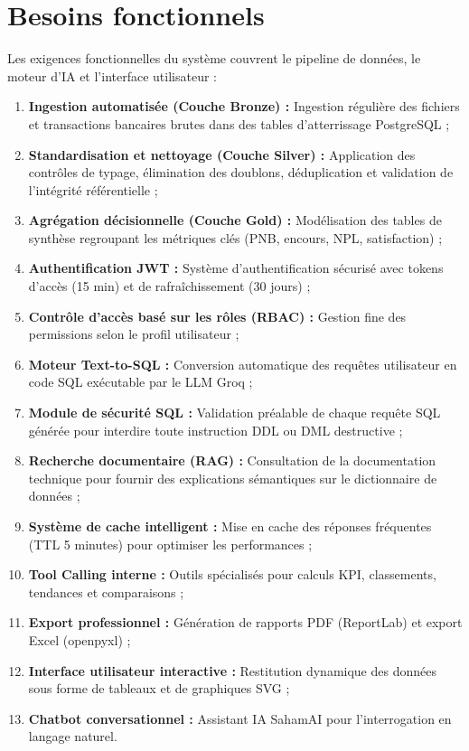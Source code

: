 \documentclass[a4paper,12pt]{report}
\begin{document}
\section{Besoins fonctionnels}
\begin{doublespace}
Les exigences fonctionnelles du système couvrent le pipeline de données, le moteur d'IA et l'interface utilisateur :
\begin{enumerate}
    \item \textbf{Ingestion automatisée (Couche Bronze) :} Ingestion régulière des fichiers et transactions bancaires brutes dans des tables d'atterrissage PostgreSQL ;
    \item \textbf{Standardisation et nettoyage (Couche Silver) :} Application des contrôles de typage, élimination des doublons, déduplication et validation de l'intégrité référentielle ;
    \item \textbf{Agrégation décisionnelle (Couche Gold) :} Modélisation des tables de synthèse regroupant les métriques clés (PNB, encours, NPL, satisfaction) ;
    \item \textbf{Authentification JWT :} Système d'authentification sécurisé avec tokens d'accès (15 min) et de rafraîchissement (30 jours) ;
    \item \textbf{Contrôle d'accès basé sur les rôles (RBAC) :} Gestion fine des permissions selon le profil utilisateur ;
    \item \textbf{Moteur Text-to-SQL :} Conversion automatique des requêtes utilisateur en code SQL exécutable par le LLM Groq ;
    \item \textbf{Module de sécurité SQL :} Validation préalable de chaque requête SQL générée pour interdire toute instruction DDL ou DML destructive ;
    \item \textbf{Recherche documentaire (RAG) :} Consultation de la documentation technique pour fournir des explications sémantiques sur le dictionnaire de données ;
    \item \textbf{Système de cache intelligent :} Mise en cache des réponses fréquentes (TTL 5 minutes) pour optimiser les performances ;
    \item \textbf{Tool Calling interne :} Outils spécialisés pour calculs KPI, classements, tendances et comparaisons ;
    \item \textbf{Export professionnel :} Génération de rapports PDF (ReportLab) et export Excel (openpyxl) ;
    \item \textbf{Interface utilisateur interactive :} Restitution dynamique des données sous forme de tableaux et de graphiques SVG ;
    \item \textbf{Chatbot conversationnel :} Assistant IA SahamAI pour l'interrogation en langage naturel.
\end{enumerate}
\end{doublespace}
\end{document}
